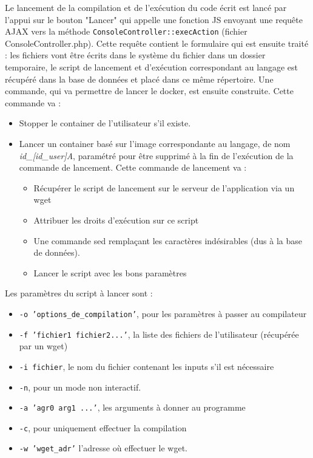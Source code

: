 Le lancement de la compilation et de l'exécution du code écrit est lancé par l'appui sur le bouton "Lancer" qui appelle une fonction JS envoyant une requête AJAX vers la méthode \texttt{ConsoleController::execAction} (fichier ConsoleController.php). Cette requête contient le formulaire qui est ensuite traité : les fichiers vont être écrits dans le système du fichier dans un dossier temporaire, le script de lancement et d'exécution correspondant au langage est récupéré dans la base de données et placé dans ce même répertoire. Une commande, qui va permettre de lancer le docker, est ensuite construite. Cette commande va :
\begin{itemize}
  \item Stopper le container de l'utilisateur s'il existe.
  \item{Lancer un container basé sur l'image correspondante au langage, de nom \emph{id\_[id\_user]A}, paramétré pour être supprimé à la fin de l'exécution de la commande de lancement. Cette commande de lancement va :
  \begin{itemize}
    \item Récupérer le script de lancement sur le serveur de l'application via un wget
    \item Attribuer les droits d'exécution sur ce script
    \item Une commande sed remplaçant les caractères indésirables (dus à la base de données).
    \item Lancer le script avec les bons paramètres
  \end{itemize}}
\end{itemize}

Les paramètres du script à lancer sont :
\begin{itemize}
  \item \texttt{-o 'options\_de\_compilation'}, pour les paramètres à passer au compilateur
  \item \texttt{-f 'fichier1 fichier2...'}, la liste des fichiers de l'utilisateur (récupérée par un wget)
  \item \texttt{-i fichier}, le nom du fichier contenant les inputs s'il est nécessaire
  \item \texttt{-n}, pour un mode non interactif.
  \item \texttt{-a 'agr0 arg1 ...'}, les arguments à donner au programme
  \item \texttt{-c}, pour uniquement effectuer la compilation
  \item \texttt{-w 'wget\_adr'} l'adresse où effectuer le wget.
\end{itemize}

